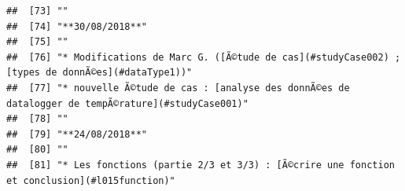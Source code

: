 \documentclass[]{book}
\begin{document}
\begin{verbatim}
##  [73] ""                                                                                                                                                                                                                                                                                                           
##  [74] "**30/08/2018**"                                                                                                                                                                                                                                                                                             
##  [75] ""                                                                                                                                                                                                                                                                                                           
##  [76] "* Modifications de Marc G. ([Ã©tude de cas](#studyCase002) ; [types de donnÃ©es](#dataType1))"                                                                                                                                                                                                              
##  [77] "* nouvelle Ã©tude de cas : [analyse des donnÃ©es de datalogger de tempÃ©rature](#studyCase001)"                                                                                                                                                                                                             
##  [78] ""                                                                                                                                                                                                                                                                                                           
##  [79] "**24/08/2018**"                                                                                                                                                                                                                                                                                             
##  [80] ""                                                                                                                                                                                                                                                                                                           
##  [81] "* Les fonctions (partie 2/3 et 3/3) : [Ã©crire une fonction et conclusion](#l015function)"                                                                                                                                                                                                                  

\end{verbatim}
\end{document}
